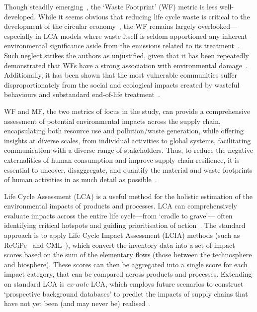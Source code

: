Though steadily emerging~\citep{laurenti2016wastefootprint,demirer2019wastefootprint,guillotreau2023wastefootprint}, the `Waste Footprint' (WF) metric is less well-developed. While it seems obvious that reducing life cycle waste is critical to the development of the circular economy~\citep{towa2020wastefootprint,ellenmacarthur2015ce}, the WF remains largely overlooked---especially in LCA models where waste itself is seldom apportioned any inherent environmental significance aside from the emissions related to its treatment~\citep{laurenti2023wastefootprint}. Such neglect strikes the authors as unjustified, given that it has been repeatedly demonstrated that WFs have a strong association with environmental damage~\citep{laurenti2023wastefootprint,doka2024publications, ridoutt2010wasteimpacts,jaio2013wasteabsorbtionfootprint}. Additionally, it has been shown that the most vulnerable communities suffer disproportionately from the social and ecological impacts created by wasteful behaviours and substandard end-of-life treatment~\citep{pellow2023envjusticewaste,akese2018envjustice}.

WF and MF, the two metrics of focus in the study, can provide a comprehensive assessment of potential environmental impacts across the supply chain, encapsulating both resource use and pollution/waste generation, while offering insights at diverse scales, from individual activities to global systems, facilitating communication with a diverse range of stakeholders. Thus, to reduce the negative externalities of human consumption and improve supply chain resilience, it is essential to uncover, disaggregate, and quantify the material and waste footprints of human activities in as much detail as possible~\citep{bisinella2024wastelca, towa2020wastefootprint,berger2020mineralsinlca,sonderegger2020mineralsinlca}.


Life Cycle Assessment (LCA) is a useful method for the holistic estimation of the environmental impacts of products and processes. LCA can comprehensively evaluate impacts across the entire life cycle---from `cradle to grave'--- often identifying critical hotspots and guiding prioritisation of action~\citep{guinee2011lca}. The standard approach is to apply Life Cycle Impact Assessment (LCIA) methods (such as ReCiPe~\citep{huijbregts2016recipe} and CML~\citep{guinee2002cml}), which convert the inventory data into a set of impact scores based on the sum of the elementary flows (those between the technosphere and biosphere). These scores can then be aggregated into a single score for each impact category, that can be compared across products and processes. Extending on standard LCA is \textit{ex-ante} LCA, which employs future scenarios to construct `prospective background databases' to predict the impacts of supply chains that have not yet been (and may never be) realised~\citep{cucurachi2018exante,blanco2020exante}.

